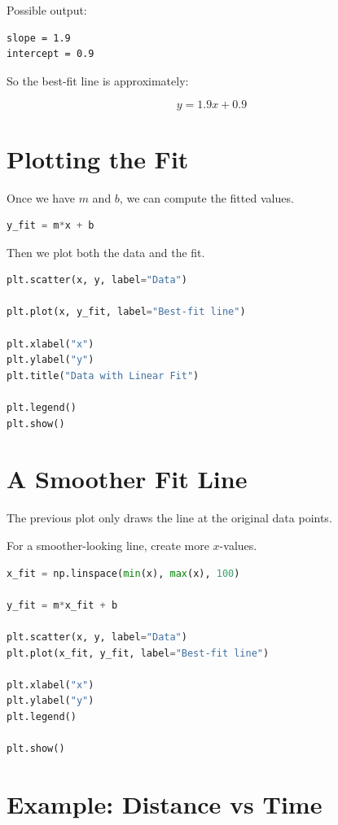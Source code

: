 \documentclass[11pt]{article}
\begin{document}
Possible output:

\begin{verbatim}
slope = 1.9
intercept = 0.9
\end{verbatim}

So the best-fit line is approximately:

\[
y = 1.9x + 0.9
\]

\section{Plotting the Fit}

Once we have \(m\) and \(b\), we can compute the fitted values.

\begin{lstlisting}[language=Python]
y_fit = m*x + b
\end{lstlisting}

Then we plot both the data and the fit.

\begin{lstlisting}[language=Python]
plt.scatter(x, y, label="Data")

plt.plot(x, y_fit, label="Best-fit line")

plt.xlabel("x")
plt.ylabel("y")
plt.title("Data with Linear Fit")

plt.legend()
plt.show()
\end{lstlisting}

\section{A Smoother Fit Line}

The previous plot only draws the line at the original data points.

For a smoother-looking line, create more \(x\)-values.

\begin{lstlisting}[language=Python]
x_fit = np.linspace(min(x), max(x), 100)

y_fit = m*x_fit + b

plt.scatter(x, y, label="Data")
plt.plot(x_fit, y_fit, label="Best-fit line")

plt.xlabel("x")
plt.ylabel("y")
plt.legend()

plt.show()
\end{lstlisting}

\section{Example: Distance vs Time}
\end{document}

